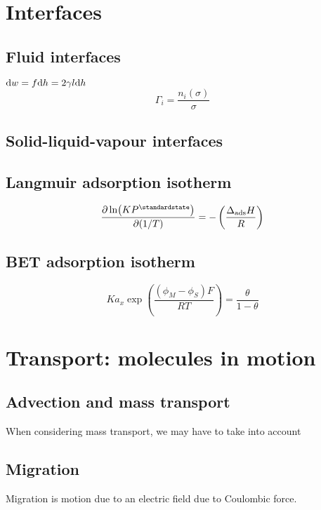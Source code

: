 \section{Interfaces}

\subsection*{Fluid interfaces} %
$\differential w = f \differential h = 2 \gamma l \differential h$
\begin{equation*}
    \Gamma_i = \frac{n_i(\sigma)}{\sigma}
\end{equation*}

\subsection*{Solid-liquid-vapour interfaces}

\subsection*{Langmuir adsorption isotherm}
\begin{equation*}
    \pdv{\ln(KP^\standardstate)}{(1/T)} = - \left(\frac{\Delta_{\textrm{ads}}H}{R}\right)
\end{equation*}

\subsection*{BET adsorption isotherm}
\begin{equation*}
    Ka_x \exp(\frac{(\phi_M - \phi_S)F}{RT}) = \frac{\theta}{1 - \theta}
\end{equation*}

\section{Transport: molecules in motion}

\subsection*{Advection and mass transport}

When considering mass transport, we may have to take into account

\subsection*{Migration}
Migration is motion due to an electric field due to Coulombic force.

